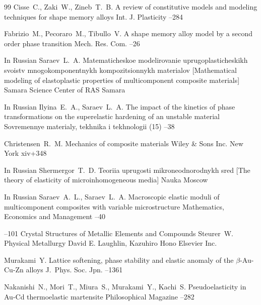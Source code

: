 \begin{thebibliography}{99}
\by Cisse~C., Zaki~W., Zineb~T.~B.
\paper A review of constitutive models and modeling techniques for shape memory alloys
\jour Int. J. Plasticity 
--284

\by Fabrizio~M., Pecoraro~M., Tibullo~V.
\paper A shape memory alloy model by a second order phase transition
\jour Mech. Res. Com.
--26

\lang In Russian
\by Saraev~L.~A.
\book Matematicheskoe modelirovanie uprugoplasticheskikh svoistv mnogokomponentnykh kompozitsionnykh materialov
\rm [Mathematical modeling of elastoplastic properties of multicomponent composite materials]
\publ Samara Science Center of RAS
\publaddr Samara 


\lang In Russian
\by Ilyina~E.~A., Saraev~L.~A.
\paper The impact of the kinetics of phase transformations on the superelastic hardening of an unstable material
\jour Sovremennye materialy, tekhnika i tekhnologii
(15)
--38



\by Christensen~R.~M.
\book Mechanics of composite materials
\publ Wiley \& Sons Inc.
\publaddr New York
\totalpages xiv+348



\lang In Russian
\by Shermergor~T.~D.
\book Teoriia uprugosti mikroneodnorodnykh sred \rm [The theory of elasticity of microinhomogeneous media]
\publ Nauka
\publaddr Moscow


\lang In Russian
\by Saraev~A.~L., Saraev~L.~A.
\paper Macroscopic elastic moduli of multicomponent composites with variable microstructure
\jour Mathematics, Economics and Management
--40


--101
\paper Crystal Structures of Metallic Elements and Compounds
\by Steurer~W.
\inbook  Physical Metallurgy
\eds David E. Laughlin, Kazuhiro Hono
\publaddr Elsevier Inc.


\by Murakami~Y.
\paper Lattice softening, phase stability and elastic anomaly of the $\beta$-Au-Cu-Zn alloys
\jour J.~Phys. Soc. Jpn.
--1361

\by Nakanishi~N.,  Mori~T.,  Miura~S., Murakami~Y.,   Kachi~S.
\paper Pseudoelasticity in Au-Cd thermoelastic martensite
\jour Philosophical Magazine
--282

\end{thebibliography}

\renewcommand{\baselinestretch}{0.9}

%
